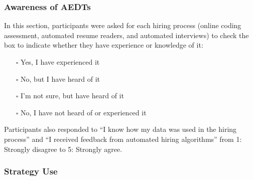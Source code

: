 \subsubsection{Awareness of AEDTs}

In this section, participants were asked for each hiring process (online coding assessment, automated resume readers, and automated interviews) to check the box to indicate whether they have experience or knowledge of it:
\begin{itemize}
    \item[$\square$] Yes, I have experienced it
    \item[$\square$] No, but I have heard of it
    \item[$\square$] I'm not sure, but have heard of it
    \item[$\square$] No, I have not heard of or experienced it
\end{itemize}

Participants also responded to ``I know how my data was used in the hiring process'' and ``I received feedback from automated hiring algorithms'' from 1: Strongly disagree to 5: Strongly agree.

\subsubsection{Strategy Use}

